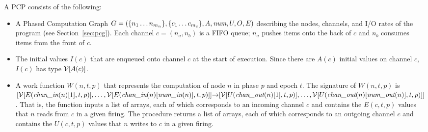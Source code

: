 A PCP consists of the following:
\begin{itemize}

\item A Phased Computation Graph $G = (\{n_1 \dots n_{m_n}\}, \{c_1
\dots c_{m_c}\}, A, \mbox{\it num}, U, O, E)$ describing the nodes,
channels, and I/O rates of the program (see Section~\ref{sec:pcg}).
Each channel $c = (n_a, n_b)$ is a FIFO queue; $n_a$ pushes items onto
the back of $c$ and $n_b$ consumes items from the front of $c$.

\item The initial values $I(c)$ that are enqueued onto channel $c$ at
the start of execution.  Since there are $A(c)$ initial values on
channel $c$, $I(c)$ has type ${\cal V}[A(c)]$.

%
\item A work function $W(n, t, p)$ that represents the computation of
node $n$ in phase $p$ and epoch $t$.  The signature of $W(n, t, p)$ is
$[{\cal V}[E(\mbox{\it chan\_in}(n)[1], t, p)], \dots, {\cal
V}[E(\mbox{\it chan\_in}(n)[\mbox{\it num\_in}(n)], t, p)]] {\small \rightarrow} [ {\cal
V}[U(\mbox{\it chan\_out}(n)[1], t, p)], \dots, {\cal
V}[U(\mbox{\it chan\_out}(n)[\mbox{\it num\_out}(n)], t, p)]]$.  That is, the function
inputs a list of arrays, each of which corresponds to an incoming
channel $c$ and contains the $E(c,t,p)$ values that $n$ reads from $c$
in a given firing.  The procedure returns a list of arrays, each of
which corresponds to an outgoing channel $c$ and contains the
$U(c,t,p)$ values that $n$ writes to $c$ in a given firing.

\end{itemize}


